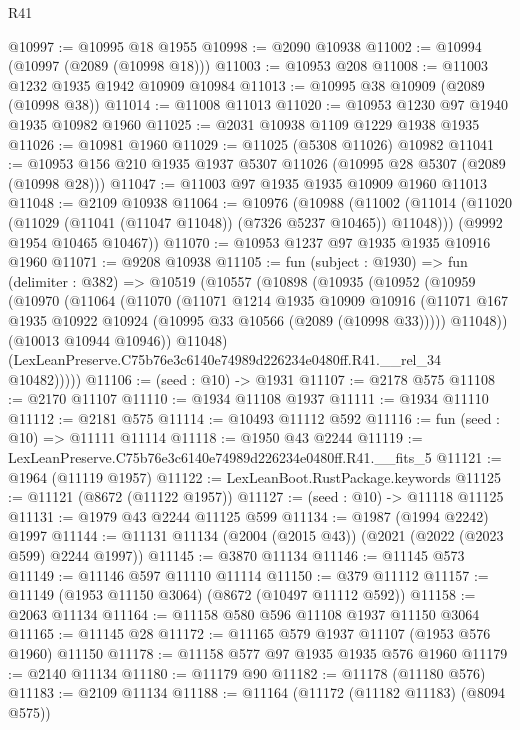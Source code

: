 \begin{lexlean}{R41}
\begin{coremodule}
@10997 := @10995 @18 @1955
@10998 := @2090 @10938
@11002 := @10994 (@10997 (@2089 (@10998 @18)))
@11003 := @10953 @208
@11008 := @11003 @1232 @1935 @1942 @10909 @10984
@11013 := @10995 @38 @10909 (@2089 (@10998 @38))
@11014 := @11008 @11013
@11020 := @10953 @1230 @97 @1940 @1935 @10982 @1960
@11025 := @2031 @10938 @1109 @1229 @1938 @1935
@11026 := @10981 @1960
@11029 := @11025 (@5308 @11026) @10982
@11041 := @10953 @156 @210 @1935 @1937 @5307 @11026 (@10995 @28 @5307 (@2089 (@10998 @28)))
@11047 := @11003 @97 @1935 @1935 @10909 @1960 @11013
@11048 := @2109 @10938
@11064 := @10976
    (@10988
      (@11002 (@11014 (@11020 (@11029 (@11041 (@11047 @11048)) (@7326 @5237 @10465)) @11048)))
      (@9992 @1954 @10465 @10467))
@11070 := @10953 @1237 @97 @1935 @1935 @10916 @1960
@11071 := @9208 @10938
@11105 := fun (subject : @1930) =>
  fun (delimiter : @382) =>
  @10519
    (@10557
      (@10898
        (@10935
          (@10952
            (@10959
              (@10970
                (@11064
                  (@11070
                    (@11071
                      @1214
                      @1935
                      @10909
                      @10916
                      (@11071 @167 @1935 @10922 @10924 (@10995 @33 @10566 (@2089 (@10998 @33)))))
                    @11048))
                (@10013 @10944 @10946))
              @11048)
            (LexLeanPreserve.C75b76e3c6140e74989d226234e0480ff.R41.__rel_34 @10482)))))
@11106 := (seed : @10) -> @1931
@11107 := @2178 @575
@11108 := @2170 @11107
@11110 := @1934 @11108 @1937
@11111 := @1934 @11110
@11112 := @2181 @575
@11114 := @10493 @11112 @592
@11116 := fun (seed : @10) => @11111 @11114
@11118 := @1950 @43 @2244
@11119 := LexLeanPreserve.C75b76e3c6140e74989d226234e0480ff.R41.__fits_5
@11121 := @1964 (@11119 @1957)
@11122 := LexLeanBoot.RustPackage.keywords
@11125 := @11121 (@8672 (@11122 @1957))
@11127 := (seed : @10) -> @11118 @11125
@11131 := @1979 @43 @2244 @11125 @599
@11134 := @1987 (@1994 @2242) @1997
@11144 := @11131 @11134 (@2004 (@2015 @43)) (@2021 (@2022 (@2023 @599) @2244 @1997))
@11145 := @3870 @11134
@11146 := @11145 @573
@11149 := @11146 @597 @11110 @11114
@11150 := @379 @11112
@11157 := @11149 (@1953 @11150 @3064) (@8672 (@10497 @11112 @592))
@11158 := @2063 @11134
@11164 := @11158 @580 @596 @11108 @1937 @11150 @3064
@11165 := @11145 @28
@11172 := @11165 @579 @1937 @11107 (@1953 @576 @1960) @11150
@11178 := @11158 @577 @97 @1935 @1935 @576 @1960
@11179 := @2140 @11134
@11180 := @11179 @90
@11182 := @11178 (@11180 @576)
@11183 := @2109 @11134
@11188 := @11164 (@11172 (@11182 @11183) (@8094 @575))

\end{coremodule}
\end{lexlean}
